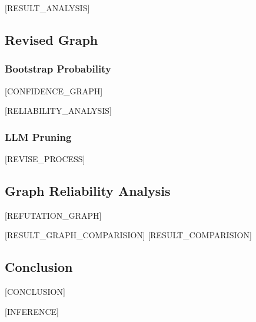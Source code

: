 \documentclass{article}
\begin{document}
[RESULT_ANALYSIS]

\clearpage

\subsection{Revised Graph}

\subsubsection{Bootstrap Probability}
[CONFIDENCE_GRAPH]

[RELIABILITY_ANALYSIS]

\subsubsection{LLM Pruning}

[REVISE_PROCESS]


\subsection{Graph Reliability Analysis}

[REFUTATION_GRAPH]

[RESULT_GRAPH_COMPARISION]
[RESULT_COMPARISION]

\subsection{Conclusion}
[CONCLUSION]

[INFERENCE]
\end{document}
